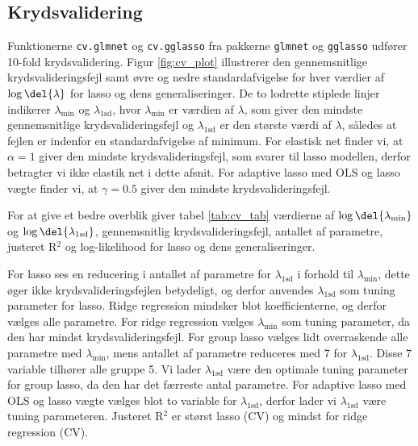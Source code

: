 \subsection{Krydsvalidering}
Funktionerne \texttt{cv.glmnet} og \texttt{cv.gglasso} fra pakkerne \texttt{glmnet} og \texttt{gglasso} udfører 10-fold krydsvalidering.
Figur \ref{fig:cv_plot} illustrerer den gennemsnitlige krydsvalideringsfejl samt øvre og nedre standardafvigelse for hver værdier af $\log \del{\lambda}$ for lasso og dens generaliseringer. 
De to lodrette stiplede linjer indikerer \(\lambda_{\text{min}}\) og \(\lambda_\text{1sd}\), hvor \(\lambda_{\text{min}}\) er værdien af \(\lambda\), som giver den mindste gennemsnitlige krydsvalideringsfejl og \(\lambda_\text{1sd}\) er den største værdi af \(\lambda\), således at fejlen er indenfor en standardafvigelse af minimum. 
For elastisk net finder vi, at $\alpha =1$ giver den mindste krydsvalideringsfejl, som svarer til lasso modellen, derfor betragter vi ikke elastik net i dette afsnit. 
For adaptive lasso med OLS og lasso vægte finder vi, at $\gamma = 0.5$ giver den mindste krydsvalideringsfejl. 

%
For at give et bedre overblik giver tabel \ref{tab:cv_tab} værdierne af $\log \del{ \lambda_{\min}}$ og $\log \del{ \lambda_{1\text{sd}}}$, gennemsnitlig krydsvalideringsfejl, antallet af parametre, justeret R$^2$ og log-likelihood for lasso og dens generaliseringer.

 

For lasso ses en reducering i antallet af parametre for $\lambda_{1\text{sd}}$ i forhold til $\lambda_{\min}$, dette øger ikke krydsvalideringsfejlen betydeligt, og derfor anvendes $\lambda_{1\text{sd}}$ som tuning parameter for lasso. 
Ridge regression mindsker blot koefficienterne, og derfor vælges alle parametre. 
For ridge regression vælges \(\lambda_{\min}\) som tuning parameter, da den har mindst krydsvalideringsfejl.
For group lasso vælges lidt overraskende alle parametre med \(\lambda_\text{min}\), mens antallet af parametre reduceres med 7 for $\lambda_{1\text{sd}}$. 
Disse 7 variable tilhører alle gruppe 5.
Vi lader $\lambda_{1\text{sd}}$ være den optimale tuning parameter for group lasso, da den har det færreste antal parametre.
For adaptive lasso med OLS og lasso vægte vælges blot to variable for \(\lambda_{1\text{sd}}\), derfor lader vi $\lambda_{1\text{sd}}$ være tuning parameteren.  
Justeret R\(^2\) er størst lasso (CV) og mindst for ridge regression (CV).

